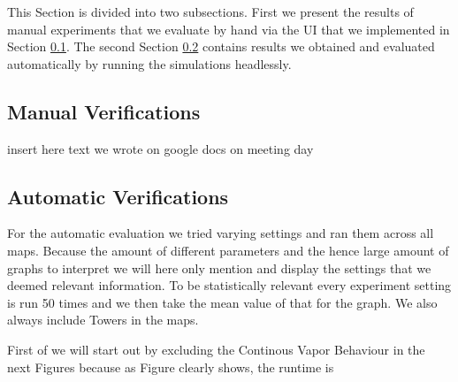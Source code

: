 This Section is divided into two subsections. First we present the results of manual experiments that we evaluate by hand via the UI that we implemented in Section \ref{sec:manualver}.
The second Section \ref{sec:autover} contains results we obtained and evaluated automatically by running the simulations headlessly.

\subsection{Manual Verifications}
\label{sec:manualver}
insert here text we wrote on google docs on meeting day


\subsection{Automatic Verifications}
\label{sec:autover}
For the automatic evaluation we tried varying settings and ran them across all maps. Because the amount of different parameters and the hence large amount of graphs to interpret we will here only mention and display the settings that we deemed relevant information. To be statistically relevant every experiment setting is run 50 times and we then take the mean value of that for the graph. We also always include Towers in the maps.

First of we will start out by excluding the Continous Vapor Behaviour in the next Figures because as Figure clearly shows, the runtime is 



